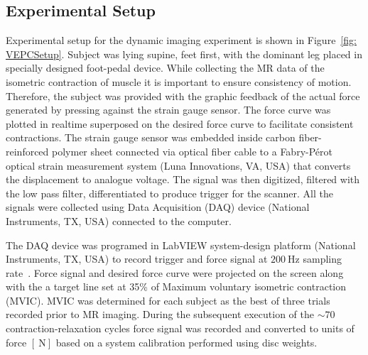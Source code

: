 \subsection{Experimental Setup}
Experimental setup for the dynamic imaging experiment is shown in Figure~\ref{fig: VEPCSetup}.
Subject was lying supine, feet first, with the dominant leg placed in specially designed foot-pedal device.
While collecting the MR data of the isometric contraction of muscle it is important to ensure consistency of motion.
Therefore, the subject was provided with the graphic feedback of the actual force generated by pressing against the strain gauge sensor. 
The force curve was plotted in realtime superposed on the desired force curve to facilitate consistent contractions. 
The strain gauge sensor was embedded inside carbon fiber-reinforced polymer sheet connected via optical fiber cable to a Fabry-P\'erot optical strain measurement system (Luna Innovations, VA, USA) that converts the displacement to analogue voltage. 
The signal was then digitized, filtered with the low pass filter, differentiated to produce trigger for the scanner. All the signals were collected using Data Acquisition (DAQ) device (National Instruments, TX, USA) connected to the computer.

The DAQ device was programed in LabVIEW system-design platform (National Instruments, TX, USA) to record trigger and force signal at $\SI{200}{\hertz}$ sampling rate~\cite{LabView}. 
Force signal and desired force curve were projected on the screen along with the a target line set at 35\% of Maximum voluntary isometric contraction (MVIC). 
MVIC was determined for each subject as the best of three trials recorded prior to MR imaging. 
During the subsequent execution of the $\sim70$ contraction-relaxation cycles force signal was recorded and converted to units of force $\left[ \SI{}{\newton}\right]$ based on a system calibration  performed using disc weights.

